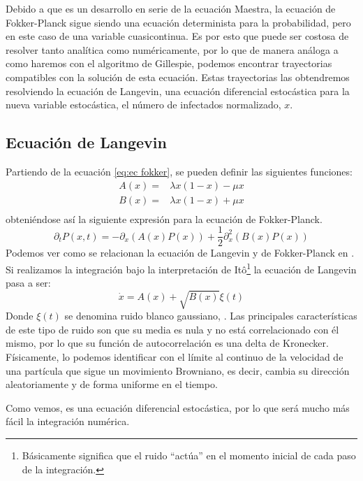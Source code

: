 Debido a que es un desarrollo en serie de la ecuación Maestra, la ecuación de Fokker-Planck sigue siendo una ecuación determinista para la
probabilidad, pero en este caso de una variable cuasicontinua. Es por esto que puede ser costosa de resolver tanto analítica como numéricamente,
por lo que de manera análoga a como haremos con el algoritmo de Gillespie, podemos encontrar trayectorias compatibles con la solución de esta 
ecuación. Estas trayectorias las obtendremos resolviendo la ecuación de Langevin, una ecuación diferencial estocástica para la nueva variable
estocástica, el número de infectados normalizado, $x$.


\subsection{Ecuación de Langevin}
Partiendo de la ecuación \ref{eq:ec fokker}, se pueden definir las siguientes funciones:
\begin{equation}
    \begin{split}
        A(x)=&\lambda x (1-x)-\mu x\\
        B(x)=&\lambda x (1-x)+\mu x\\
    \end{split}
    \label{eq:A y B}
\end{equation}
obteniéndose así la siguiente expresión para la ecuación de Fokker-Planck.
$$\partial_t P(x,t)=-\partial_x(A(x)P(x))+\dfrac{1}{2}\partial^2_x(B(x)P(x))$$
\newpage
Podemos ver como se relacionan la ecuación de Langevin y de Fokker-Planck en \cite{McKane,Toral}.
Si realizamos la integración bajo la interpretación de Itô\footnote{Básicamente significa que el ruido ``actúa'' en el momento inicial de cada paso de la integración.}
la ecuación de Langevin pasa a ser:
\begin{equation}
    \dot{x}=A(x)+\sqrt{B(x)}\xi(t)
    \label{eq:Langevin general}
\end{equation}
Donde $\xi(t)$ se denomina ruido blanco gaussiano, \cite{McKane,Toral}. Las principales características de este tipo de ruido son que su media es nula 
y no está correlacionado con él mismo, por lo que su función de autocorrelación es una delta de Kronecker. Físicamente, lo podemos identificar con el límite al continuo de la 
velocidad de una partícula que sigue un movimiento Browniano, es decir, cambia su dirección aleatoriamente y de forma uniforme en el tiempo. 

Como vemos, es una ecuación diferencial estocástica, por lo que será mucho más fácil la integración numérica.

